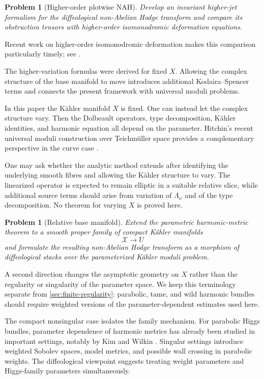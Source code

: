 \documentclass[11pt,reqno]{amsart}
\newtheorem{problem}[theorem]{Problem}
\theoremstyle{definition}
\theoremstyle{remark}
\begin{document}
\begin{problem}[Higher-order plotwise NAH]\label{prob:higher-order}
Develop an invariant higher-jet formalism for the diffeological non-Abelian Hodge transform and compare its obstruction tensors with higher-order isomonodromic deformation equations.
\end{problem}

Recent work on higher-order isomonodromic deformation makes this comparison particularly timely; see \cite{HuSunYangZuo2026}.


The higher-variation formulas were derived for fixed $X$.  Allowing the complex structure of the base manifold to move introduces additional Kodaira--Spencer terms and connects the present framework with universal moduli problems.


In this paper the K\"ahler manifold $X$ is fixed.  One can instead let the complex structure vary.  Then the Dolbeault operators, type decomposition, K\"ahler identities, and harmonic equation all depend on the parameter.  Hitchin's recent universal moduli construction over Teichm\"uller space provides a complementary perspective in the curve case \cite{Hitchin2026Universal}.

One may ask whether the analytic method extends after identifying the underlying smooth fibres and allowing the K\"ahler structure to vary.  The linearized operator is expected to remain elliptic in a suitable relative slice, while additional source terms should arise from variation of $\Lambda_\omega$ and of the type decomposition.  No theorem for varying $X$ is proved here.

\begin{problem}[Relative base manifold]\label{prob:varying-X}
Extend the parametric harmonic-metric theorem to a smooth proper family of compact K\"ahler manifolds
\[
  \mathcal X\to U
\]
and formulate the resulting non-Abelian Hodge transform as a morphism of diffeological stacks over the parameterized K\"ahler moduli problem.
\end{problem}


A second direction changes the asymptotic geometry on $X$ rather than the regularity or singularity of the parameter space.  We keep this terminology separate from \cref{sec:finite-regularity}: parabolic, tame, and wild harmonic bundles should require weighted versions of the parameter-dependent estimates used here.


The compact nonsingular case isolates the family mechanism.  For parabolic Higgs bundles, parameter dependence of harmonic metrics has already been studied in important settings, notably by Kim and Wilkin \cite{KimWilkin2018}.  Singular settings introduce weighted Sobolev spaces, model metrics, and possible wall crossing in parabolic weights.  The diffeological viewpoint suggests treating weight parameters and Higgs-family parameters simultaneously.
\end{document}
